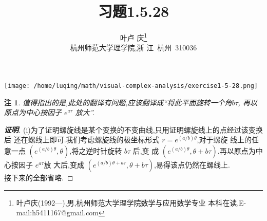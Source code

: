 \documentclass[a4paper]{article}
\newtheorem*{remark}{注}
\begin{document}
\title{\huge{\bf{习题1.5.28}}} \author{\small{叶卢
    庆\footnote{叶卢庆(1992---),男,杭州师范大学理学院数学与应用数学专业
      本科在读,E-mail:h5411167@gmail.com}}\\{\small{杭州师范大学理学院,浙
      江~杭州~310036}}}
\maketitle
\texttt{[image: /home/luqing/math/visual-complex-analysis/exercise1-5-28.png]}
\begin{remark}
  值得指出的是,此处的翻译有问题,应该翻译成“将此平面旋转一个角$b\tau$,
  再以原点为中心按因子 $e^{a\tau}$ 放大”.
\end{remark}
\begin{proof}[\textbf{证明}]
(i)为了证明螺旋线是某个变换的不变曲线,只用证明螺旋线上的点经过该变换后
还在螺线上即可.我们考虑螺旋线的极坐标形式 $r=e^{(a/b)\theta}$,对于螺旋
线上的任意一点 $(e^{(a/b)\theta},\theta)$,将之逆时针旋转 $b\tau$ 后,变
成 $(e^{(a/b)\theta},\theta+b\tau)$.再以原点为中心按因子 $e^{a\tau}$放
大后,变成 $(e^{(a/b)\theta+a\tau},\theta+b\tau)$,易得该点仍然在螺线上.\\
接下来的全部省略.
\end{proof}
\end{document}
